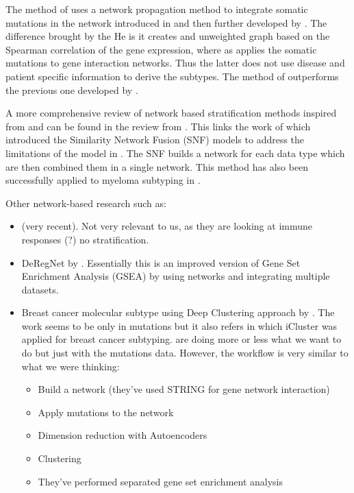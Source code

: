 The method of \citet{He2017-dj} uses a network propagation method to integrate somatic mutations in the network introduced in \citet{Vanunu2010-el} and then further developed by \citet{Hofree2013-ld}. The difference brought by the He is it creates and unweighted graph based on the Spearman correlation of the gene expression, where as \citet{Hofree2013-ld} applies the somatic mutations to gene interaction networks. Thus the latter does not use disease and patient specific information to derive the subtypes. The method of \citet{He2017-dj} outperforms the previous one developed by \citet{Hofree2013-ld}.


A more comprehensive review of network based stratification methods inspired from \citet{Hofree2013-ld} and \citet{He2017-dj} can be found in the review from \citet{Petti2023-qo}. This links the work of \citet{Wang2014-wr} which introduced the Similarity Network Fusion (SNF) models to address the limitations of the model in \citet{Hofree2013-ld}. The SNF builds a network for each data type which are then combined them in a single network. This method has also been successfully applied to myeloma subtyping in \citet{Bhalla2021-uv}.




Other network-based research such as:
\begin{itemize}
    \item \citet{Kong2022-gv} (very recent). Not very relevant to us, as they are looking at immune responses (?) no stratification.
     \item DeRegNet by \citet{Winkler2022-vg}. Essentially this is an improved version of Gene Set Enrichment Analysis (GSEA) by using networks and integrating multiple datasets.
     \item Breast cancer molecular subtype using Deep Clustering approach by \citet{Rohani2020-px}. The work seems to be only in mutations but it also refers \citet{Curtis2012-ff} in which iCluster was applied for breast cancer subtyping. \citet{Rohani2020-px} are doing more or less what we want to do but just with the mutations data. However, the workflow is very similar to what we were thinking:
     \begin{itemize}
         \item Build a network (they've used STRING for gene network interaction)
         \item Apply mutations to the network
         \item Dimension reduction with Autoencoders
         \item Clustering
         \item They've performed separated gene set enrichment analysis
     \end{itemize}
\end{itemize}




